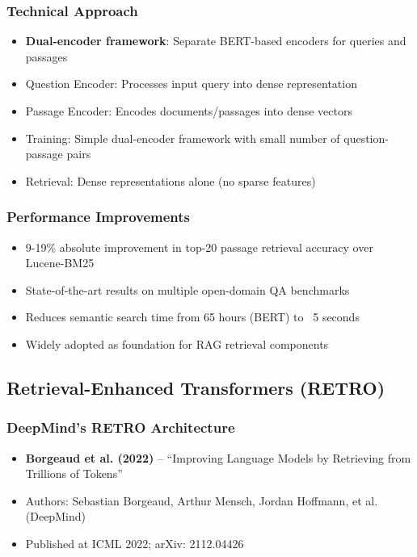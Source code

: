 \documentclass[11pt,letterpaper]{article}
\begin{document}
\subsubsection{Technical Approach}
\begin{itemize}[leftmargin=*]
    \item \textbf{Dual-encoder framework}: Separate BERT-based encoders for queries and passages
    \item Question Encoder: Processes input query into dense representation
    \item Passage Encoder: Encodes documents/passages into dense vectors
    \item Training: Simple dual-encoder framework with small number of question-passage pairs
    \item Retrieval: Dense representations alone (no sparse features)
\end{itemize}

\subsubsection{Performance Improvements}
\begin{itemize}[leftmargin=*]
    \item 9-19\% absolute improvement in top-20 passage retrieval accuracy over Lucene-BM25
    \item State-of-the-art results on multiple open-domain QA benchmarks
    \item Reduces semantic search time from 65 hours (BERT) to ~5 seconds
    \item Widely adopted as foundation for RAG retrieval components
\end{itemize}

\subsection{Retrieval-Enhanced Transformers (RETRO)}

\subsubsection{DeepMind's RETRO Architecture}
\begin{itemize}[leftmargin=*]
    \item \textbf{Borgeaud et al. (2022)} -- ``Improving Language Models by Retrieving from Trillions of Tokens'' \cite{borgeaud2022retro}
    \item Authors: Sebastian Borgeaud, Arthur Mensch, Jordan Hoffmann, et al. (DeepMind)
    \item Published at ICML 2022; arXiv: 2112.04426
\end{itemize}
\end{document}
